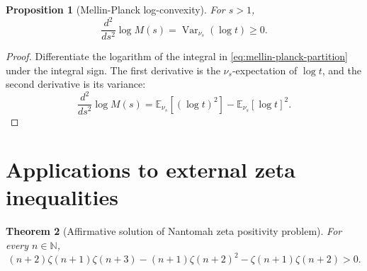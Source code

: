 \documentclass[11pt]{article}
\numberwithin{equation}{section}
\newtheorem{theorem}{Theorem}[section]
\newtheorem{proposition}[theorem]{Proposition}
\theoremstyle{definition}
\theoremstyle{remark}
\DeclareMathOperator{\Var}{Var}
\newcommand{\E}{\mathbb E}
\newcommand{\N}{\mathbb N}
\newcommand{\1}{\mathbf 1}
\begin{document}
\begin{proposition}[Mellin-Planck log-convexity]
\label{prop:mellin-planck-log-convexity}
For \(s>1\),
\begin{equation}
\label{eq:mellin-planck-log-convexity}
\frac{d^2}{ds^2}\log M(s)=\Var_{\nu_s}(\log t)\ge0.
\end{equation}
\end{proposition}

\begin{proof}
Differentiate the logarithm of the integral in \eqref{eq:mellin-planck-partition} under the integral sign.  The first derivative is the \(\nu_s\)-expectation of \(\log t\), and the second derivative is its variance:
\begin{equation}
\label{eq:mellin-planck-variance-proof}
\frac{d^2}{ds^2}\log M(s)
=\E_{\nu_s}[(\log t)^2]-\E_{\nu_s}[\log t]^2.
\end{equation}
\end{proof}

\section{Applications to external zeta inequalities}

\begin{theorem}[Affirmative solution of Nantomah zeta positivity problem]
\label{thm:nantomah-positivity}
For every \(n\in\N\),
\begin{equation}
\label{eq:nantomah-positivity}
(n+2)\zeta(n+1)\zeta(n+3)
-(n+1)\zeta(n+2)^2
-\zeta(n+1)\zeta(n+2)>0.
\end{equation}
\end{theorem}
\end{document}
